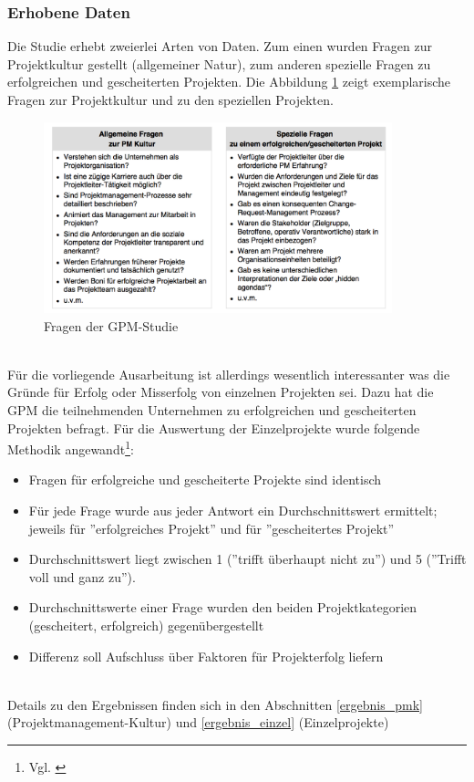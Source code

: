 \documentclass[12pt]{scrartcl}
\begin{document}
\subsubsection{Erhobene Daten}
\label{erhobene_daten}
Die Studie erhebt zweierlei Arten von Daten. Zum einen wurden Fragen zur Projektkultur gestellt (allgemeiner Natur), zum anderen spezielle Fragen zu erfolgreichen und gescheiterten Projekten. Die Abbildung \ref{fragen_gpm_studie} zeigt exemplarische Fragen zur Projektkultur und zu den speziellen Projekten. 

\begin{figure}[H]
	\begin{center}
		\includegraphics[width=0.9\textwidth]{img/fragen_gpm_studie}
		\caption{Fragen der GPM-Studie}
		\label{fragen_gpm_studie}	
	\end{center}
\end{figure}
\ 
\\
Für die vorliegende Ausarbeitung ist allerdings wesentlich interessanter was die Gründe für Erfolg oder Misserfolg von einzelnen Projekten sei. Dazu hat die GPM die teilnehmenden Unternehmen zu erfolgreichen und gescheiterten Projekten befragt. Für die Auswertung der Einzelprojekte wurde folgende Methodik angewandt\footnote{Vgl. \cite{GPM_Studie_2008, Seite 9}}:
\begin{itemize}
    \item{Fragen für erfolgreiche und gescheiterte Projekte sind identisch}
    \item{Für jede Frage wurde aus jeder Antwort ein Durchschnittswert ermittelt; jeweils für ''erfolgreiches Projekt'' und für ''gescheitertes Projekt''}
    \item{Durchschnittswert liegt zwischen 1 (''trifft überhaupt nicht zu'') und 5 (''Trifft voll und ganz zu'').}
    \item{Durchschnittswerte einer Frage wurden den beiden Projektkategorien (gescheitert, erfolgreich) gegenübergestellt}
    \item{Differenz soll Aufschluss über Faktoren für Projekterfolg liefern}
\end{itemize}
\
\\
Details zu den Ergebnissen finden sich in den Abschnitten \ref{ergebnis_pmk} (Projektmanagement-Kultur) und \ref{ergebnis_einzel} (Einzelprojekte)
\end{document}
